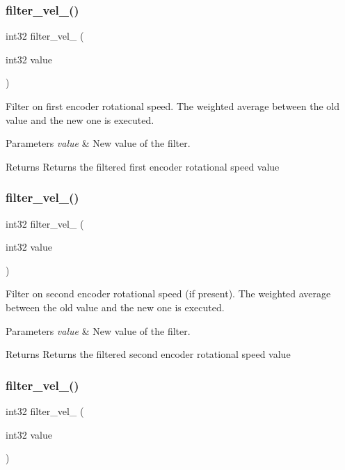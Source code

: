 \subsubsection{filter\+\_\+vel\+\_()}
{\footnotesize\ttfamily int32 filter\+\_\+vel\+\_ (\begin{DoxyParamCaption}\item[{int32}]{value }\end{DoxyParamCaption})}

Filter on first encoder rotational speed. The weighted average between the old value and the new one is executed.


\begin{DoxyParams}{Parameters}
{\em value} & New value of the filter.\\
\hline
\end{DoxyParams}
\begin{DoxyReturn}{Returns}
Returns the filtered first encoder rotational speed value 
\end{DoxyReturn}
\mbox{\label{utils_8h_abda54d76e676bb1cb27b5577bd0fe099}} 
\subsubsection{filter\+\_\+vel\+\_()}
{\footnotesize\ttfamily int32 filter\+\_\+vel\+\_ (\begin{DoxyParamCaption}\item[{int32}]{value }\end{DoxyParamCaption})}

Filter on second encoder rotational speed (if present). The weighted average between the old value and the new one is executed.


\begin{DoxyParams}{Parameters}
{\em value} & New value of the filter.\\
\hline
\end{DoxyParams}
\begin{DoxyReturn}{Returns}
Returns the filtered second encoder rotational speed value 
\end{DoxyReturn}
\mbox{\label{utils_8h_a70430ee90ed28e4c9fca0c4ca3d6583e}} 
\subsubsection{filter\+\_\+vel\+\_()}
{\footnotesize\ttfamily int32 filter\+\_\+vel\+\_ (\begin{DoxyParamCaption}\item[{int32}]{value }\end{DoxyParamCaption})}

